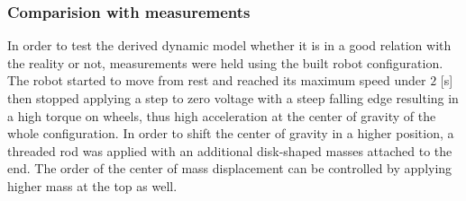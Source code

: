 \documentclass[12pt,english,twoside]{article}
\begin{document}
\subsubsection{Comparision with measurements}
In order to test the derived dynamic model whether it is in a good relation with the reality or not, measurements were held using the built robot configuration. The robot started to move from rest and reached its maximum speed under $2$ [s] then stopped applying a step to zero voltage with a steep falling edge resulting in a high torque on wheels, thus high acceleration at the center of gravity of the whole configuration. In order to shift the center of gravity in a higher position, a threaded rod was applied with an additional disk-shaped masses attached to the end. The order of the center of mass displacement can be controlled by applying higher mass at the top as well. 
\end{document}
